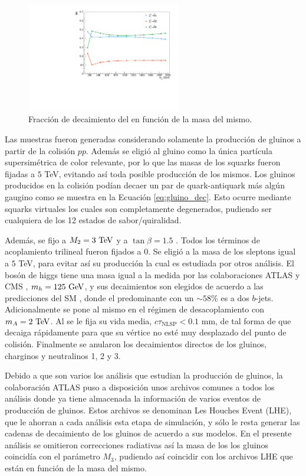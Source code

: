 \begin{figure}
  \centering
  \includegraphics[width=0.6\textwidth]{images/analysis/phb_n1_br.pdf}
  \caption{Fracción de decaimiento del \ninoone en función de la masa del mismo.}
  \label{fig:n1_br}
\end{figure}

Las muestras fueron generadas considerando solamente la producción de gluinos a partir de la colisión $pp$. Además se eligió al gluino como la única partícula supersimétrica de color relevante, por lo que las masas de los squarks fueron fijadas a $5$ TeV, evitando así toda posible producción de los mismos. Los gluinos producidos en la colisión podían decaer un par de quark-antiquark más algún gaugino como se muestra en la Ecuación \ref{eq:gluino_dec}. Esto ocurre mediante squarks virtuales los cuales son completamente degenerados, pudiendo ser cualquiera de los 12 estados de sabor/quiralidad.

Además, se fijo a $M_2=3\ \text{TeV}$ y a $\tan{\beta}=1.5$ . Todos los términos de acoplamiento trilineal fueron fijados a 0. Se eligió a la masa de los sleptons igual a $5$ TeV, para evitar así su producción la cual es estudiada por otros análisis. El bosón de higgs tiene una masa igual a la medida por las colaboraciones ATLAS y CMS \cite{higgs_mass}, $m_h=125\ \gev$, y sus decaimientos son elegidos de acuerdo a las predicciones del SM , donde el predominante con un $\sim58$\% es a dos $b$-jets.
Adicionalmente se pone al mismo en el régimen de desacoplamiento con $m_A = 2\ \text{TeV}$. Al \ninoone se le fija su vida media, $c\tau_{\text{NLSP}}<0.1$ mm, de tal forma de que decaiga rápidamente  para que su vértice no esté muy desplazado del punto de colisión. Finalmente se anularon los decaimientos directos de los gluinos, charginos y neutralinos 1, 2 y 3. 


Debido a que son varios los análisis que estudian la producción de gluinos, la colaboración ATLAS puso a disposición unos archivos comunes a todos los análisis donde ya tiene almacenada la información de varios eventos de producción de gluinos. Estos archivos se denominan Les Houches Event (LHE), que le ahorran a cada análisis esta etapa de simulación, y sólo le resta generar las cadenas de decaimiento de los gluinos de acuerdo a sus modelos. En el presente análisis se omitieron correcciones radiativas así la masa de los los gluinos coincidía con el parámetro $M_3$, pudiendo así coincidir con los archivos LHE que están en función de la masa del mismo.

